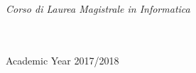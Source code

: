 \documentclass[
11pt, %
english, %
singlespacing, %
headsepline, %
]{MastersDoctoralThesis} %
\begin{document}
\begin{titlepage}
\begin{center}
			\vfill
			
			\large \textit{Corso di Laurea Magistrale in Informatica}\\[0.3cm] %
			\textit{}\\[0.4cm]
			\deptname\\[2cm] %
			
			\vfill
			
			{\large Academic Year 2017/2018}\\[4cm] %
			
			\vfill
		\end{center}
	\end{titlepage}









%
% 
% 
\end{document}
